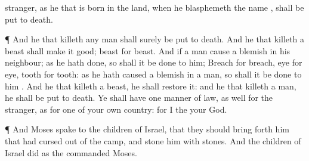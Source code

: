 {stranger, as he that is born in the
land, when he
blasphemeth the
name
{}, shall be put to
death.
\par }{\PP {}¶ And
he that
killeth
any
man shall
surely be put to
death.
And he that
killeth a
beast shall make it
good;
beast for
beast.
And if a
man
cause a
blemish in his
neighbour; as he hath
done, so shall it be
done to him;
Breach for
breach,
eye for
eye,
tooth for
tooth: as he hath
caused a
blemish in a
man, so shall it be
done to him
{}.
And he that
killeth a
beast, he shall
restore it: and he that
killeth a
man, he shall be put to
death.
Ye shall have
one manner of
law, as well for the
stranger, as for one of your own
country: for I
{} the
{} your
God.
\par }{\PP {}¶ And
Moses
spake to the
children of
Israel, that they should bring
forth him that had
cursed
out of the
camp, and
stone him with
stones. And the
children of
Israel
did as the
{}
commanded
Moses.

}
